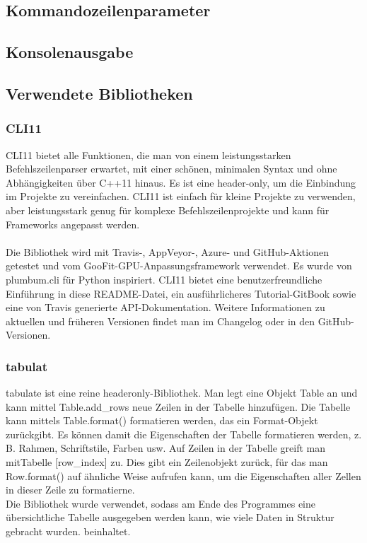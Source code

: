 \documentclass[a4paper,12pt]{article}
\begin{document}
\subsection{Kommandozeilenparameter}


\subsection{Konsolenausgabe}

\newpage
\noindent
\subsection{Verwendete Bibliotheken}
\subsubsection{CLI11}
CLI11 bietet alle Funktionen, die man von einem leistungsstarken Befehlszeilenparser erwartet, mit einer schönen, minimalen Syntax und ohne 
Abhängigkeiten über C++11 hinaus. Es ist eine header-only, um die Einbindung im Projekte zu 
vereinfachen. CLI11 ist einfach für kleine Projekte zu verwenden, aber leistungsstark genug für komplexe Befehlszeilenprojekte und kann für Frameworks angepasst werden. \\\\
Die Bibliothek wird mit Travis-, AppVeyor-, Azure- und GitHub-Aktionen getestet und vom GooFit-GPU-Anpassungsframework verwendet. 
Es wurde von plumbum.cli für Python inspiriert. CLI11 bietet eine benutzerfreundliche Einführung in diese README-Datei, ein ausführlicheres Tutorial-GitBook sowie eine von Travis generierte API-Dokumentation. 
Weitere Informationen zu aktuellen und früheren Versionen findet man im Changelog oder in den GitHub-Versionen.
\subsubsection{tabulat}
tabulate ist eine reine headeronly-Bibliothek. 
Man legt eine Objekt Table an und kann mittel Table.add\_rows neue Zeilen in der Tabelle hinzufügen.
Die Tabelle kann mittels Table.format() formatieren werden, das ein Format-Objekt zurückgibt. 
Es können damit die Eigenschaften der Tabelle formatieren werden, z. B. Rahmen, Schriftstile, Farben usw.
Auf Zeilen in der Tabelle greift man mitTabelle [row\_index] zu. Dies gibt ein Zeilenobjekt zurück, für das man Row.format() auf ähnliche Weise aufrufen kann, um die Eigenschaften aller Zellen in dieser Zeile zu formatierne.\\
Die Bibliothek wurde verwendet, sodass am Ende des Programmes eine übersichtliche Tabelle ausgegeben werden kann, wie viele Daten in Struktur gebracht wurden.
beinhaltet.
\end{document}
